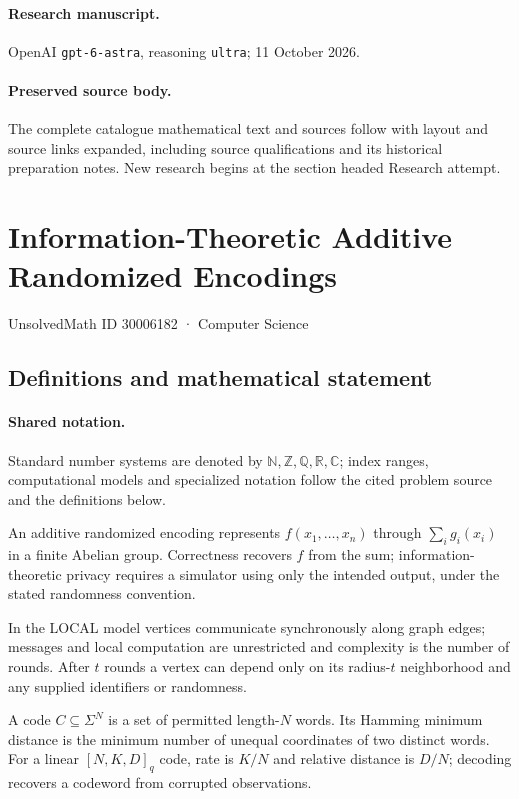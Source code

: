 \documentclass[11pt]{article}
\begin{document}
\paragraph{Research manuscript.} OpenAI \texttt{gpt-6-astra}, reasoning \texttt{ultra}; 11 October 2026.
\paragraph{Preserved source body.} The complete catalogue mathematical text and sources follow with layout and source links expanded, including source qualifications and its historical preparation notes. New research begins at the section headed Research attempt.

\section{Information-Theoretic Additive Randomized Encodings}\label{30006182}
{\small UnsolvedMath ID 30006182 · Computer Science}
\subsection{Definitions and mathematical statement}

\paragraph{Shared notation.}Standard number systems are denoted by $\mathbb N,\mathbb Z,\mathbb Q,\mathbb R,\mathbb C$; index ranges, computational models and specialized notation follow the cited problem source and the definitions below.


An additive randomized encoding represents $f(x_1,\ldots,x_n)$ through $\sum_i g_i(x_i)$ in a finite Abelian group. Correctness recovers $f$ from the sum; information-theoretic privacy requires a simulator using only the intended output, under the stated randomness convention.

In the LOCAL model vertices communicate synchronously along graph edges; messages and local computation are unrestricted and complexity is the number of rounds. After $t$ rounds a vertex can depend only on its radius-$t$ neighborhood and any supplied identifiers or randomness.

A code $C\subseteq\Sigma^N$ is a set of permitted length-$N$ words. Its Hamming minimum distance is the minimum number of unequal coordinates of two distinct words. For a linear $[N,K,D]_q$ code, rate is $K/N$ and relative distance is $D/N$; decoding recovers a codeword from corrupted observations.
\end{document}

